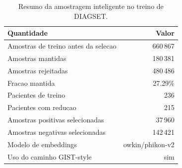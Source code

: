 \begin{table}[!htb]
\centering
\caption{Resumo da amostragem inteligente no treino de DIAGSET.}
\label{tab:results_diagset-smart-sampling}
\small
\begin{tabular}{lr}
\toprule
Quantidade & Valor \\
\midrule
Amostras de treino antes da selecao & 660\,867 \\
Amostras mantidas & 180\,381 \\
Amostras rejeitadas & 480\,486 \\
Fracao mantida & 27.29\% \\
Pacientes de treino & 236 \\
Pacientes com reducao & 215 \\
Amostras positivas selecionadas & 37\,960 \\
Amostras negativas selecionadas & 142\,421 \\
Modelo de embeddings & owkin/phikon-v2 \\
Uso do caminho GIST-style & sim \\
\bottomrule
\end{tabular}
\end{table}

